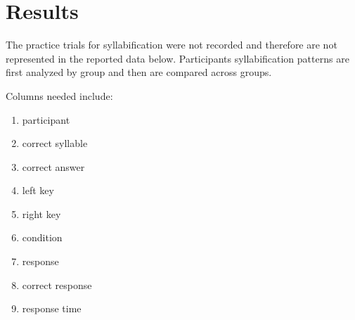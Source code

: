 \documentclass[
12pt, %
english, %
doublespacing, %
nolistspacing, %
liststotoc, %
headsepline, %
chapterinoneline, %
openany, %
]{DoctoralThesis}\usepackage[]{graphicx}\usepackage[]{color}
\begin{document}

\section{Results}

The practice trials for syllabification were not recorded and therefore are not represented in the reported data below. Participants syllabification patterns are first analyzed by group and then are compared across groups. 




Columns needed include:
\begin{enumerate}
\item{participant}
\item{correct syllable}
\item{correct answer}
\item{left key}
\item{right key}
\item{condition}
\item{response}
\item{correct response}
\item{response time}
\end{enumerate}


\end{document}
